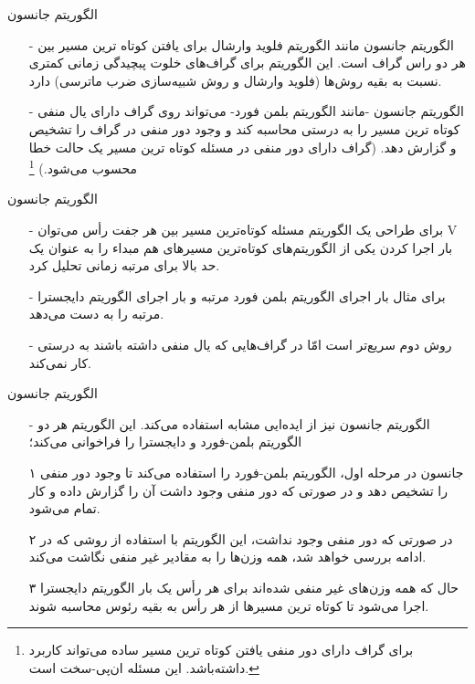 \begin{frame}{الگوریتم جانسون}
\begin{itemize}\itemr
\item[-]
الگوریتم جانسون
مانند الگوریتم فلوید وارشال برای یافتن کوتاه ترین مسیر بین هر دو راس گراف است. این الگوریتم برای گراف‌های خلوت پبچیدگی زمانی کمتری نسبت به بقیه روش‌ها (فلوید وارشال و روش شبیه‌سازی ضرب ماترسی) دارد.

\item[-]
الگوریتم جانسون -مانند الگوریتم بلمن فورد- می‌تواند روی گراف دارای یال منفی کوتاه ترین مسیر را به درستی محاسبه کند و وجود دور منفی در گراف را تشخیص و گزارش دهد. (گراف دارای دور منفی در مسئله کوتاه ترین مسیر یک حالت خطا محسوب می‌شود.)
\footnote{برای گراف دارای دور منفی یافتن کوتاه ترین مسیر ساده می‌تواند کاربرد داشته‌باشد. این مسئله ان‌پی-سخت است.}
\end{itemize}
\end{frame}

\begin{frame}{الگوریتم جانسون}
	\begin{itemize}\itemr
\item[-]
برای طراحی یک الگوریتم مسئله کوتاه‌ترین مسیر بین هر جفت رأس می‌توان V بار اجرا کردن یکی از الگوریتم‌های کوتاه‌ترین مسیرهای هم مبداء را به عنوان یک حد بالا برای مرتبه زمانی تحلیل کرد.

\item[-]
برای مثال
بار اجرای الگوریتم بلمن فورد مرتبه
و
بار اجرای الگوریتم دایجسترا مرتبه
را به دست می‌دهد.
\item[-]
روش دوم سریع‌تر است امّا در گراف‌‌هایی که یال منفی داشته باشند به درستی کار نمی‌کند.
	\end{itemize}
\end{frame}

\begin{frame}{الگوریتم جانسون}
\begin{itemize}\itemr
\item[-]
الگوریتم جانسون نیز از ایده‌ایی مشابه استفاده می‌کند. این الگوریتم هر دو الگوریتم بلمن-فورد و دایجسترا را فراخوانی می‌کند؛
\item[۱]
جانسون در مرحله اول، الگوریتم بلمن-فورد را استفاده می‌کند تا وجود دور منفی را تشخیص دهد و در صورتی که دور منفی وجود داشت آن را گزارش داده و کار تمام می‌شود.
\item[۲]
در صورتی که دور منفی وجود نداشت، این الگوریتم با استفاده از روشی که در ادامه بررسی خواهد شد، همه وزن‌ها را به مقادیر غیر منفی نگاشت می‌کند.
\item[۳]
حال که همه وزن‌‌های غیر منفی شده‌اند برای هر رأس یک بار الگوریتم دایجسترا اجرا می‌شود تا کوتاه ترین مسیرها از هر رأس به بقیه رئوس محاسبه شوند.
\end{itemize}
\end{frame}

